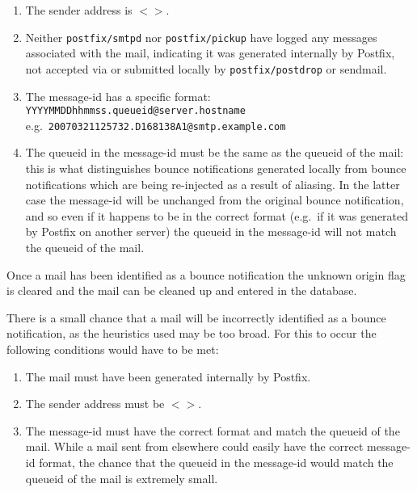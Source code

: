 \documentclass[a4paper,12pt,draft]{article}
\newcommand{\daemon}[1]{%
    \texttt{postfix/#1}%
}
\begin{document}
\begin{enumerate}

    \item The sender address is $<>$.

    \item Neither \daemon{smtpd} nor \daemon{pickup} have logged any
        messages associated with the mail, indicating it was generated
        internally by Postfix, not accepted via \SMTP{} or submitted
        locally by \daemon{postdrop} or sendmail.

    \item The message-id has a specific format: \newline
        \texttt{YYYYMMDDhhmmss.queueid@server.hostname} \newline
        e.g.\ \texttt{20070321125732.D168138A1@smtp.example.com}

    \item The queueid in the message-id must be the same as the queueid of
        the mail: this is what distinguishes bounce notifications generated
        locally from bounce notifications which are being re-injected as a
        result of aliasing.  In the latter case the message-id will be
        unchanged from the original bounce notification, and so even if it
        happens to be in the correct format (e.g.\ if it was generated by
        Postfix on another server) the queueid in the message-id will not
        match the queueid of the mail.

\end{enumerate}

Once a mail has been identified as a bounce notification the unknown origin
flag is cleared and the mail can be cleaned up and entered in the database.

There is a small chance that a mail will be incorrectly identified as a
bounce notification, as the heuristics used may be too broad.  For this to
occur the following conditions would have to be met:

\begin{enumerate}

    \item The mail must have been generated internally by Postfix.

    \item The sender address must be $<>$.

    \item The message-id must have the correct format and match the queueid
        of the mail.  While a mail sent from elsewhere could easily have
        the correct message-id format, the chance that the queueid in the
        message-id would match the queueid of the mail is extremely small.

\end{enumerate}
\end{document}
